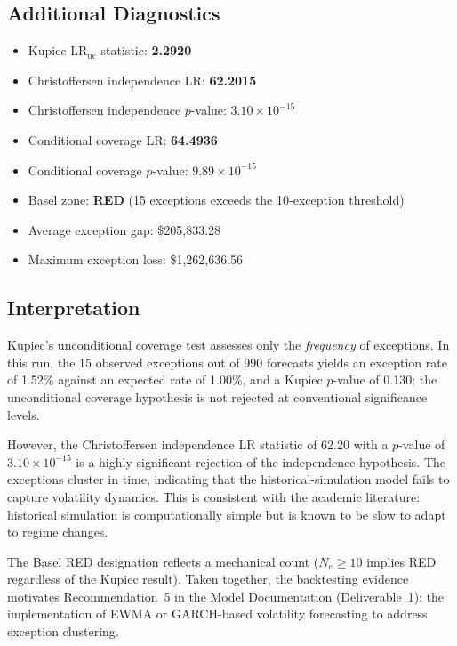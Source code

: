 \documentclass[11pt]{article}
\begin{document}
\subsection{Additional Diagnostics}

\begin{itemize}
  \item Kupiec $\mathrm{LR}_{\mathrm{uc}}$ statistic: \textbf{2.2920}
  \item Christoffersen independence LR: \textbf{62.2015}
  \item Christoffersen independence $p$-value: $3.10 \times 10^{-15}$
  \item Conditional coverage LR: \textbf{64.4936}
  \item Conditional coverage $p$-value: $9.89 \times 10^{-15}$
  \item Basel zone: \textbf{RED} (15 exceptions exceeds the 10-exception threshold)
  \item Average exception gap: \$205,833.28
  \item Maximum exception loss: \$1,262,636.56
\end{itemize}

\subsection{Interpretation}

Kupiec's unconditional coverage test assesses only the \emph{frequency}
of exceptions.  In this run, the 15 observed exceptions out of 990
forecasts yields an exception rate of 1.52\% against an expected rate
of 1.00\%, and a Kupiec $p$-value of 0.130; the unconditional coverage
hypothesis is not rejected at conventional significance levels.

However, the Christoffersen independence LR statistic of 62.20 with a
$p$-value of $3.10 \times 10^{-15}$ is a highly significant rejection of
the independence hypothesis.  The exceptions cluster in time, indicating
that the historical-simulation model fails to capture volatility dynamics.
This is consistent with the academic literature: historical simulation
is computationally simple but is known to be slow to adapt to regime
changes.

The Basel RED designation reflects a mechanical count ($N_e \geq 10$
implies RED regardless of the Kupiec result).  Taken together, the
backtesting evidence motivates Recommendation~5 in the Model Documentation
(Deliverable~1): the implementation of EWMA or GARCH-based volatility
forecasting to address exception clustering.
\end{document}
